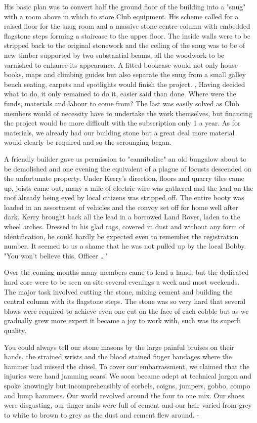 \documentclass[a5paper,openany,font 10pt]{scrbook}
\begin{document}
His basic plan was to convert half the ground floor of the
building into a "snug" with a room above in which to store Club
equipment. His scheme called for a raised floor for the snug room
and a massive stone centre column with embedded flagstone steps
forming a staircase to the upper floor. The inside walls were to
be stripped back to the original stonework and the ceiling of the
snug was to be of new timber supported by two substantial beams,
all the woodwork to be varnished to enhance its appearance. A
fitted bookcase would not only house books, maps and climbing
guides but also separate the snug from a small galley  bench
seating, carpets and spotlights would finish the project. ,
Having decided what to do, it only remained to do it, easier
said than done. Where were the funds, materials and labour to
come from? The last was easily solved as Club members would of
necessity have to undertake the work themselves, but financing
the project would be  more difficult with the subscription only
 1 a year. As for materials, we already had our building stone
but a great deal more material would clearly be required and so
the scrounging began.

A friendly builder gave us permission to "cannibalise" an
old bungalow about to be demolished and one evening the
equivalent of a plague of locusts descended on the unfortunate
property. Under Kerry's direction, floors and quarry tiles came
up, joists came out, many a mile of electric wire was gathered
and the lead on the roof  already being eyed by local citizens
was stripped off. The entire booty was loaded in an assortment of
vehicles and the convoy set off for home well after dark. Kerry
brought back all the lead in a borrowed Land Rover, laden to the
wheel arches. Dressed in his glad rags, covered in dust and
without any form of identification, he could hardly be expected
even to remember the registration number. It seemed to us a shame
that he was not pulled up by the local Bobby. "You won't believe
this, Officer \ldots{}"

Over the coming months many members came to lend a hand, but
the dedicated hard core were to be seen on site several evenings
a week and most weekends. The major task involved cutting the
stone, mixing cement and building the central column with its
flagstone steps. The stone was so very hard that several blows
were required to achieve even one cut on the face of each cobble
but as we gradually grew more expert it became a joy to work
with, such was its superb quality.

You could always tell our stone masons by the large painful
bruises on their hands, the strained wrists and the blood stained
finger bandages where the hammer had missed the chisel. To cover
our embarrassment, we claimed that the injuries were hand jamming
scars! We soon became adept at technical jargon and spoke
knowingly but incomprehensibly of corbels, coigns, jumpers,
gobbo, compo and lump hammers. Our world revolved around the
four to one mix. Our shoes were disgusting, our finger nails were
full of cement and our hair varied from grey to white to brown to
grey as the dust and cement flew around. -
\end{document}
